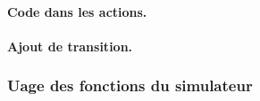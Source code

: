 \paragraph{Code dans les actions.}

\paragraph{Ajout de transition.}


\subsubsection{Uage des fonctions du simulateur}
